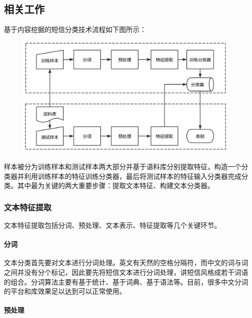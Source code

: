 \documentclass{article}
\begin{document}
\subsection{相关工作}\label{ux76f8ux5173ux5de5ux4f5c}

基于内容挖掘的短信分类技术流程如下图所示：

\begin{figure}[htbp]
\centering
\includegraphics{./images/text_classfication.png}
\caption{}
\end{figure}

样本被分为训练样本和测试样本两大部分并基于语料库分别提取特征，构造一个分类器并利用训练样本的特征训练分类器，最后将测试样本的特征输入分类器完成分类。其中最为关键的两大重要步骤：提取文本特征、构建文本分类器。

\subsubsection{文本特征提取}\label{ux6587ux672cux7279ux5f81ux63d0ux53d6}

文本特征提取包括分词、预处理、文本表示、特征提取等几个关键环节。

\paragraph{分词}\label{ux5206ux8bcd}

文本分类首先要对文本进行分词处理。英文有天然的空格分隔符，而中文的词与词之间并没有分个标记，因此要先将短信文本进行分词处理，讲短信风格成若干词语的组合。分词算法主要有基于统计、基于词典、基于语法等。目前，很多中文分词的平台和库效果足以达到可以正常使用。

\paragraph{预处理}\label{ux9884ux5904ux7406}
\end{document}

